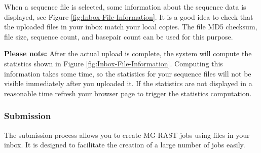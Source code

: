 \documentclass[12pt,fullpage]{report}
\begin{document}
When a sequence file is selected, some information about the sequence data is displayed, see Figure \ref{fig:Inbox-File-Information}. It is a good idea to check that the uploaded files in your inbox match your local copies. The file \gls{MD5} checksum, file size, sequence count, and basepair count can be used for this purpose.


\textbf{Please note:} After the actual upload is complete, the system will compute the statistics shown in Figure \ref{fig:Inbox-File-Information}. Computing this information takes some time, so the statistics for your sequence files will not be visible immediately after you uploaded it. If the statistics are not displayed in a reasonable time refresh your browser page to trigger the statistics computation.
\subsubsection{Submission}
The submission process allows you to create MG-RAST jobs using files in your inbox. It is designed to facilitate the creation of a large number of jobs easily.
\end{document}
